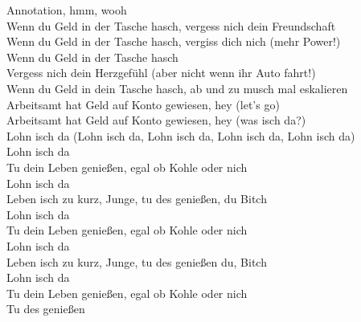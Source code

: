 Annotation, hmm, wooh\\
Wenn du Geld in der Tasche hasch, vergess nich dein Freundschaft\\
Wenn du Geld in der Tasche hasch, vergiss dich nich (mehr Power!)\\
Wenn du Geld in der Tasche hasch\\
Vergess nich dein Herzgefühl (aber nicht wenn ihr Auto fahrt!)\\
Wenn du Geld in dein Tasche hasch, ab und zu musch mal eskalieren\\
Arbeitsamt hat Geld auf Konto gewiesen, hey (let's go)\\
Arbeitsamt hat Geld auf Konto gewiesen, hey (was isch da?)\\
Lohn isch da (Lohn isch da, Lohn isch da, Lohn isch da, Lohn isch da)\\
Lohn isch da\\
Tu dein Leben genießen, egal ob Kohle oder nich\\
Lohn isch da\\
Leben isch zu kurz, Junge, tu des genießen, du Bitch\\
Lohn isch da\\
Tu dein Leben genießen, egal ob Kohle oder nich\\
Lohn isch da\\
Leben isch zu kurz, Junge, tu des genießen du, Bitch\\
Lohn isch da\\
Tu dein Leben genießen, egal ob Kohle oder nich\\
Tu des genießen\\